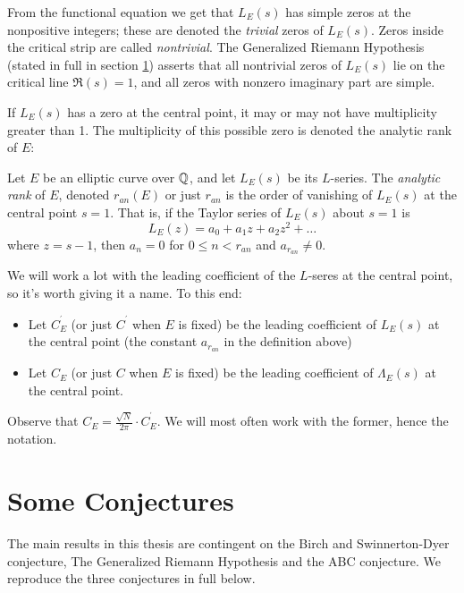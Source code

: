 \documentclass[10pt]{article}
\newcommand{\pr}{^{\prime}}
\newcommand{\Les}{L_E(s)}
\newcommand{\Lams}{\Lambda_E(s)}
\begin{document}
From the functional equation we get that $\Les$ has simple zeros at the nonpositive integers; these are denoted the {\it trivial} zeros of $\Les$. Zeros inside the critical strip are called {\it nontrivial}. The Generalized Riemann Hypothesis (stated in full in section \ref{sec:conjectures}) asserts that all nontrivial zeros of $\Les$ lie on the critical line $\Re(s)=1$, and all zeros with nonzero imaginary part are simple. 

If $\Les$ has a zero at the central point, it may or may not have multiplicity greater than 1. The multiplicity of this possible zero is denoted the analytic rank of $E$:
\begin{definition}
Let $E$ be an elliptic curve over $\mathbb{Q}$, and let $\Les$ be its $L$-series. The {\it analytic rank} of $E$, denoted $r_{an}(E)$ or just $r_{an}$ is the order of vanishing of $L_E(s)$ at the central point $s=1$. That is, if the Taylor series of $\Les$ about $s=1$ is
\begin{equation}
L_E(z) = a_0 + a_1 z + a_2 z^2 + \ldots
\end{equation}
where $z = s-1$, then $a_n = 0$ for $0 \le n < r_{an}$ and $a_{r_{an}} \ne 0$.
\end{definition}
We will work a lot with the leading coefficient of the $L$-seres at the central point, so it's worth giving it a name. To this end:
\begin{definition} \mbox{}
\begin{itemize}
\item Let $C^{\pr}_E$ (or just $C^{\pr}$ when $E$ is fixed) be the leading coefficient of $L_E(s)$ at the central point (the constant $a_{r_{an}}$ in the definition above)
\item Let $C_E$ (or just $C$ when $E$ is fixed) be the leading coefficient of $\Lams$ at the central point.
\end{itemize}
\end{definition}
Observe that $C_E = \frac{\sqrt{N}}{2\pi}\cdot C^{\pr}_E$. We will most often work with the former, hence the notation.

\newpage
\section{Some Conjectures}\label{sec:conjectures}

The main results in this thesis are contingent on the Birch and Swinnerton-Dyer conjecture, The Generalized Riemann Hypothesis and the ABC conjecture. We reproduce the three conjectures in full below. \\
\end{document}
